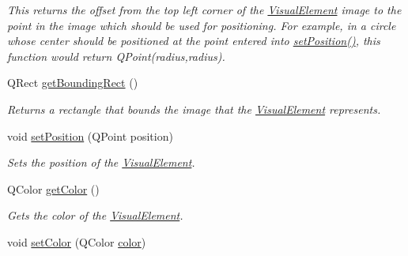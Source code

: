 \begin{DoxyCompactItemize}
\begin{DoxyCompactList}\small\item\em This returns the offset from the top left corner of the \hyperlink{struct_picto_1_1_visual_element}{Visual\-Element} image to the point in the image which should be used for positioning. For example, in a circle whose center should be positioned at the point entered into \hyperlink{struct_picto_1_1_visual_element_a454cc96862097e96a0b0f1d2c83e23ed}{set\-Position()}, this function would return Q\-Point(radius,radius). \end{DoxyCompactList}\item 
\hypertarget{struct_picto_1_1_visual_element_a2b8bd36eff13dfacf2200e7231523b6b}{Q\-Rect \hyperlink{struct_picto_1_1_visual_element_a2b8bd36eff13dfacf2200e7231523b6b}{get\-Bounding\-Rect} ()}\label{struct_picto_1_1_visual_element_a2b8bd36eff13dfacf2200e7231523b6b}

\begin{DoxyCompactList}\small\item\em Returns a rectangle that bounds the image that the \hyperlink{struct_picto_1_1_visual_element}{Visual\-Element} represents. \end{DoxyCompactList}\item 
\hypertarget{struct_picto_1_1_visual_element_a454cc96862097e96a0b0f1d2c83e23ed}{void \hyperlink{struct_picto_1_1_visual_element_a454cc96862097e96a0b0f1d2c83e23ed}{set\-Position} (Q\-Point position)}\label{struct_picto_1_1_visual_element_a454cc96862097e96a0b0f1d2c83e23ed}

\begin{DoxyCompactList}\small\item\em Sets the position of the \hyperlink{struct_picto_1_1_visual_element}{Visual\-Element}. \end{DoxyCompactList}\item 
\hypertarget{struct_picto_1_1_visual_element_a317f563e009e7b63c95969a6be219881}{Q\-Color \hyperlink{struct_picto_1_1_visual_element_a317f563e009e7b63c95969a6be219881}{get\-Color} ()}\label{struct_picto_1_1_visual_element_a317f563e009e7b63c95969a6be219881}

\begin{DoxyCompactList}\small\item\em Gets the color of the \hyperlink{struct_picto_1_1_visual_element}{Visual\-Element}. \end{DoxyCompactList}\item 
\hypertarget{struct_picto_1_1_visual_element_a44561918bbba0cc6c911623374a58091}{void \hyperlink{struct_picto_1_1_visual_element_a44561918bbba0cc6c911623374a58091}{set\-Color} (Q\-Color \hyperlink{struct_picto_1_1_visual_element_a45c3042c969717eb2ab60373369c7de7}{color})}\label{struct_picto_1_1_visual_element_a44561918bbba0cc6c911623374a58091}


\end{DoxyCompactItemize}
